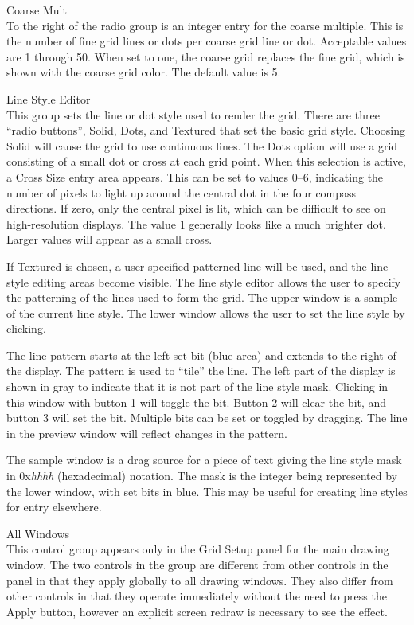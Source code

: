 \begin{description}
\item{\cb Coarse Mult}\\
To the right of the radio group is an integer entry for the coarse
multiple.  This is the number of fine grid lines or dots per coarse
grid line or dot.  Acceptable values are 1 through 50.  When set to
one, the coarse grid replaces the fine grid, which is shown with the
coarse grid color.  The default value is 5.

\item{\cb Line Style Editor}\\
This group sets the line or dot style used to render the grid.  There
are three ``radio buttons'', {\cb Solid}, {\cb Dots}, and {\cb
Textured} that set the basic grid style.  Choosing {\cb Solid} will
cause the grid to use continuous lines.  The {\cb Dots} option will
use a grid consisting of a small dot or cross at each grid point. 
When this selection is active, a {\cb Cross Size} entry area appears. 
This can be set to values 0--6, indicating the number of pixels to
light up around the central dot in the four compass directions.  If
zero, only the central pixel is lit, which can be difficult to see on
high-resolution displays.  The value 1 generally looks like a much
brighter dot.  Larger values will appear as a small cross.

If {\cb Textured} is chosen, a user-specified patterned line will be
used, and the line style editing areas become visible.  The line style
editor allows the user to specify the patterning of the lines used to
form the grid.  The upper window is a sample of the current line
style.  The lower window allows the user to set the line style by
clicking.

The line pattern starts at the left set bit (blue area) and extends to
the right of the display.  The pattern is used to ``tile'' the line. 
The left part of the display is shown in gray to indicate that it is
not part of the line style mask.  Clicking in this window with button
1 will toggle the bit.  Button 2 will clear the bit, and button 3 will
set the bit.  Multiple bits can be set or toggled by dragging.  The
line in the preview window will reflect changes in the pattern.

The sample window is a drag source for a piece of text giving the line
style mask in {\vt 0x}{\it hhhh} (hexadecimal) notation.  The mask is
the integer being represented by the lower window, with set bits in
blue.  This may be useful for creating line styles for entry
elsewhere.

\item{\cb All Windows}\\
This control group appears only in the {\cb Grid Setup} panel for the
main drawing window.  The two controls in the group are different from
other controls in the panel in that they apply globally to all drawing
windows.  They also differ from other controls in that they operate
immediately without the need to press the {\cb Apply} button, however
an explicit screen redraw is necessary to see the effect.


\end{description}
